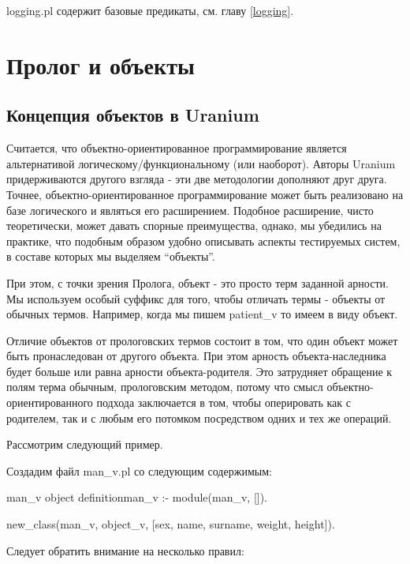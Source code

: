 \documentclass[a4paper]{book}
\def\ur{Uranium}
\begin{document}
\begin{description}
\item logging.pl содержит базовые предикаты, см. главу
  \ref{logging}.
\end{description}

\chapter{Пролог и объекты}
\label{ur_objects}

\section{Концепция объектов в \ur}
Считается, что объектно-ориентированное программирование является
альтернативой логическому/функциональному (или наоборот). Авторы
\ur{} придерживаются другого взгляда - эти две методологии
дополняют друг друга. Точнее, объектно-ориентированное
программирование может быть реализовано на базе логического и
являться его расширением. Подобное расширение, чисто
теоретически, может давать спорные преимущества, однако, мы
убедились на практике, что подобным образом удобно описывать
аспекты тестируемых систем, в составе которых мы выделяем
``объекты''. 

При этом, с точки зрения Пролога, объект - это просто терм
заданной арности. Мы используем особый суффикс для того, чтобы
отличать термы - объекты от обычных термов. Например, когда мы
пишем patient_v то имеем в виду объект. 

Отличие объектов от прологовских термов состоит в том, что один
объект может быть пронаследован от другого объекта. При этом
арность объекта-наследника будет больше или равна арности
объекта-родителя. Это затрудняет обращение к полям терма обычным,
прологовским методом, потому что смысл объектно-ориентированного
подхода заключается в том, чтобы оперировать как с родителем, так
и с любым его потомком посредством одних и тех же операций.

Рассмотрим следующий пример.

Создадим файл man_v.pl со следующим содержимым:

\begin{example}{man_v object definition}{man_v}
:- module(man_v, []).

new_class(man_v, object_v, 
          [sex, name, surname, weight, height]).
\end{example}

Следует обратить внимание на несколько правил:
\end{document}
